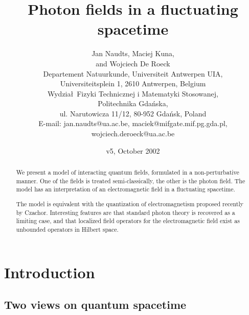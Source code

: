 \documentclass[12pt,a4paper]{article}
\begin{document}
\title{Photon fields in a fluctuating spacetime}

\author{  Jan Naudts\myHighlight{$^\circ$}\coordHE{}, Maciej Kuna\myHighlight{$^\dagger$}\coordHE{},\\
          and Wojciech De Roeck\myHighlight{$^\circ$}\coordHE{}\\
          \small
          \myHighlight{$^\circ$}\coordHE{}Departement Natuurkunde, Universiteit Antwerpen UIA,\\
          \small
          Universiteitsplein 1, 2610 Antwerpen, Belgium\\
          \small
          \myHighlight{$^\dagger$}\coordHE{}Wydzia\l\ Fizyki Technicznej i Matematyki Stosowanej,\\
	  \small
	  Politechnika Gda\'{n}ska,\\
	  \small
	  ul. Narutowicza 11/12, 80-952 Gda\'{n}sk, Poland\\
	  \small
	  E-mail: jan.naudts@ua.ac.be,
	  maciek@mifgate.mif.pg.gda.pl,\\
	  \small
	  wojciech.deroeck@ua.ac.be
}
\date{v5, October 2002}
\maketitle

\begin{abstract}

We present a model of interacting quantum fields, formulated in
a non-perturbative manner. One of the fields is treated
semi-classically, the other is the photon field. The
model has an interpretation of an electromagnetic field
in a fluctuating spacetime.

The model is equivalent with the quantization of 
electromagnetism proposed recently by Czachor.
Interesting features are that standard photon theory is recovered
as a limiting case, and that localized field operators
for the electromagnetic field exist as unbounded
operators in Hilbert space.

\end{abstract}

\section{Introduction}


\subsection{Two views on quantum spacetime}
\end{document}

